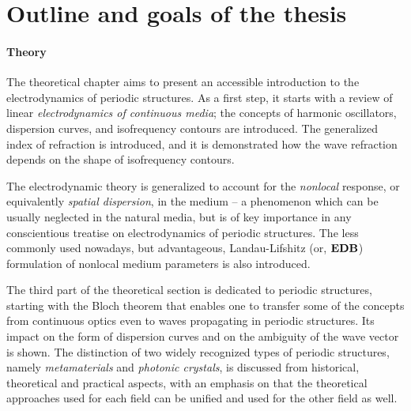 \section{Outline and goals of the thesis}

\paragraph{Theory} %
The theoretical chapter aims to present an accessible introduction to the electrodynamics of periodic structures. As a first step, it starts with a review of linear \textit{electrodynamics of continuous media}; the concepts of harmonic oscillators, dispersion curves, and isofrequency contours are introduced. The generalized index of refraction is introduced, and it is demonstrated how the wave refraction depends on the shape of isofrequency contours.

The electrodynamic theory is generalized to account for the \textit{nonlocal} response, or equivalently \textit{spatial dispersion}, in the medium -- a phenomenon which can be usually neglected in the natural media, but is of key importance in any conscientious treatise on electrodynamics of periodic structures.
The less commonly used nowadays, but advantageous, Landau-Lifshitz (or, $\mathbf{E}\mathbf{D}\mathbf{B}$) formulation of nonlocal medium parameters is also introduced. 

The third part of the theoretical section is dedicated to periodic structures, starting with the Bloch theorem that enables one to transfer some of the concepts from continuous optics even to waves propagating in periodic structures. Its impact on the form of dispersion curves and on the ambiguity of the wave vector is shown.
The distinction of two widely recognized types of periodic structures, namely \textit{metamaterials} and \textit{photonic crystals}, is discussed from historical, theoretical and practical aspects, with an emphasis on that the theoretical approaches used for each field can be unified and used for the other field as well.

